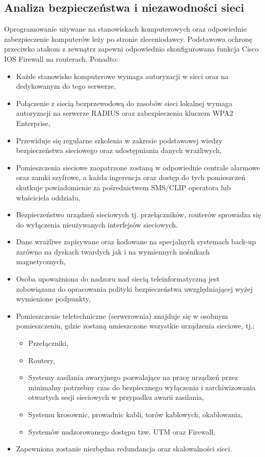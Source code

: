 \documentclass[12pt,a4paper,titlepage]{article}
\begin{document}
\newpage
\subsection{Analiza bezpieczeństwa i niezawodności sieci}

Oprogramowanie używane na stanowiskach komputerowych oraz odpowiednie zabezpieczenie komputerów leży po stronie zleceniodawcy. Podstawowa ochronę przeciwko atakom z zewnątrz zapewni odpowiednio skonfigurowana funkcja Cisco IOS Firewall na routerach. Ponadto:

\begin{itemize}
    \item Każde stanowisko komputerowe wymaga autoryzacji w sieci oraz na dedykowanym do tego serwerze,
    \item Połączenie z siecią bezprzewodową do zasobów sieci lokalnej wymaga autoryzacji na serwerze RADIUS oraz zabezpieczenia kluczem WPA2 Enterprise,
    \item Przewiduje się regularne szkolenia w zakresie podstawowej wiedzy bezpieczeństwa sieciowego oraz udostępniania danych wrażliwych,
    \item Pomieszczenia sieciowe zaopatrzone zostaną w odpowiednie centrale alarmowe oraz zamki szyfrowe, a każda ingerencja oraz dostęp do tych pomieszczeń skutkuje powiadomienie za pośrednictwem SMS/CLIP operatora lub właściciela oddziału,
    \item Bezpieczeństwo urządzeń sieciowych tj. przełączników, routerów sprowadza się do wyłączenia nieużywanych interfejsów sieciowych.
    \item Dane wrażliwe zapisywane oraz kodowane na specjalnych systemach back-up zarówno na dyskach twardych jak i na wymiennych nośnikach magnetycznych,
    \item Osoba upoważniona do nadzoru nad siecią teleinformatyczną jest zobowiązana do  opracowania polityki bezpieczeństwa uwzględniającej wyżej wymienione podpunkty,
    \item Pomieszczenie teletechniczne (serwerownia) znajduje się w osobnym pomieszczeniu, gdzie zostaną umieszczone wszystkie urządzenia sieciowe, tj.:
        \begin{itemize}
            \item Przełączniki,
            \item Routery,
            \item Systemy zasilania awaryjnego pozwalające na pracę urządzeń przez minimalny potrzebny czas do bezpiecznego wyłączenia i zarchiwizowania otwartych sesji sieciowych w przypadku awarii zasilania,
            \item Systemu krosownic, prowadnic kabli, torów kablowych, okablowania,
            \item Systemów nadzorowanego dostępu tzw. UTM oraz Firewall,
        \end{itemize}
    \item Zapewniona zostanie niezbędna redundancja oraz skalowalności sieci.
\end{itemize}
\end{document}
